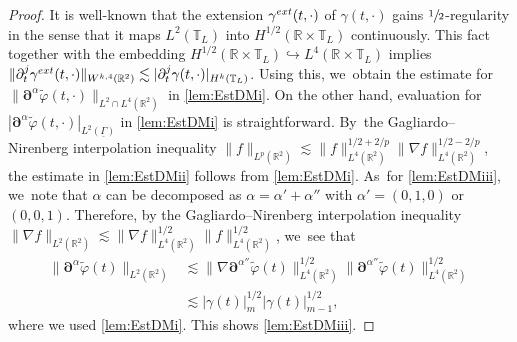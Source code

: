 \documentclass[11pt]{article}
\newcommand{\R}{{\mathbb R}}
\newcommand{\dt}{\partial_t}
\newcommand{\ul}[1]{\underline{#1}}
\newcommand{\itGamma}{\mathit{\Gamma}}
\theoremstyle{definition}
\begin{document}
\begin{proof}
It is well-known that the extension $\gamma^{\rm ext}(t,\cdot)$ of $\gamma(t,\cdot)$ gains $\sfrac12$-regularity in the sense that
it maps $L^2(\mathbb{T}_L)$ into $H^{1/2}(\R\times\mathbb{T}_L)$ continuously.
This fact together with the embedding $H^{1/2}(\R\times\mathbb{T}_L) \hookrightarrow L^4(\R\times\mathbb{T}_L)$ implies
$\|\dt^j\gamma^{\rm ext}(t,\cdot)\|_{W^{k,4}(\R^2)} \lesssim |\dt^j\gamma(t,\cdot)|_{H^k(\mathbb{T}_L)}$.
Using this, we~obtain the estimate for $\|\bm{\partial}^\alpha\widetilde{\varphi}(t,\cdot)\|_{L^2\cap L^4(\R^2)}$ in \eqref{lem:EstDMi}.
On the other hand, evaluation for $|\bm{\partial}^\alpha\widetilde{\varphi}(t,\cdot)|_{L^2(\ul{\itGamma})}$ in \eqref{lem:EstDMi} is straightforward. By~the Gagliardo--Nirenberg interpolation inequality $\|f\|_{L^p(\R^2)}\lesssim \|f\|_{L^4(\R^2)}^{1/2+2/p}\|\nabla f\|_{L^4(\R^2)}^{1/2-2/p}$,
the estimate in \eqref{lem:EstDMii} follows from \eqref{lem:EstDMi}. As~for \eqref{lem:EstDMiii}, we~note that $\alpha$ can be decomposed as $\alpha=\alpha'+\alpha''$ with $\alpha'=(0,1,0)$ or $(0,0,1)$.
Therefore, by the Gagliardo--Nirenberg interpolation inequality $\|\nabla f\|_{L^2(\R^2)} \lesssim \|\nabla f\|_{L^4(\R^2)}^{1/2} \|f\|_{L^4(\R^2)}^{1/2}$, we~see that
\begin{align*}
\|\bm{\partial}^\alpha\widetilde{\varphi}(t)\|_{L^2(\R^2)}
&\lesssim \|\nabla\bm{\partial}^{\alpha''}\widetilde{\varphi}(t)\|_{L^4(\R^2)}^{1/2} \|\bm{\partial}^{\alpha''}\widetilde{\varphi}(t)\|_{L^4(\R^2)}^{1/2} \\
&\lesssim |\gamma(t)|_m^{1/2} |\gamma(t)|_{m-1}^{1/2},
\end{align*}
where we used \eqref{lem:EstDMi}.
This shows \eqref{lem:EstDMiii}.
\end{proof}
\end{document}
